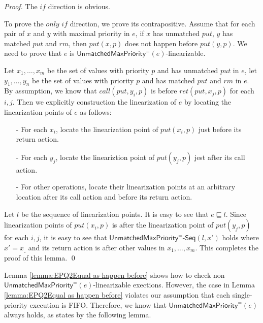 \begin {proof}

The $\textit{if}$ direction is obvious.

To prove the $\textit{only if}$ direction, we prove its contrapositive. Assume that for each pair of $x$ and $y$ with maximal priority in $e$, if $x$ has unmatched $\textit{put}$, $y$ has matched $\textit{put}$ and $\textit{rm}$, then $\textit{put}(x,p)$ does not happen before $\textit{put}(y,p)$. We need to prove that $e$ is $\mathsf{UnmatchedMaxPriority}^{=}(e)$-linearizable. 

Let $x_1,\ldots,x_m$ be the set of values with priority $p$ and has unmatched $\textit{put}$ in $e$, let $y_1,\ldots,y_n$ be the set of values with priority $p$ and has matched $\textit{put}$ and $\textit{rm}$ in $e$. By assumption, we know that $\textit{call}(\textit{put},y_i,p)$ is before $\textit{ret}(\textit{put},x_j,p)$ for each $i,j$. Then we explicitly construction the linearization of $e$ by locating the linearization points of $e$ as follows:

\begin{itemize}
\setlength{\itemsep}{0.5pt}
\item[-] For each $x_i$, locate the linearization point of $\textit{put}(x_i,p)$ just before its return action.

\item[-] For each $y_j$, locate the lineariztion point of $\textit{put}(y_j,p)$ jest after its call action.

\item[-] For other operations, locate their linearization points at an arbitrary location after its call action and before its return action.
\end{itemize}

Let $l$ be the sequence of linearization points. It is easy to see that $e \sqsubseteq l$. Since linearization points of $\textit{put}(x_i,p)$ is after the linearization point of $\textit{put}(y_j,p)$ for each $i,j$, it is easy to see that $\mathsf{UnmatchedMaxPriority}^{=}\mathsf{\text{-}Seq}(l,x')$ holds where $x' = x_{\_}$ and its return action is after other values in $x_1,\ldots,x_m$. This completes the proof of this lemma. \qed
\end {proof}

Lemma \ref{lemma:EPQ2Equal as happen before} shows how to check non $\mathsf{UnmatchedMaxPriority}^{=}(e)$-linearizable exections. However, the case in Lemma \ref{lemma:EPQ2Equal as happen before} violates our assumption that each single-priority execution is FIFO. Therefore, we know that $\mathsf{UnmatchedMaxPriority}^{=}(e)$ always holds, as states by the following lemma.


